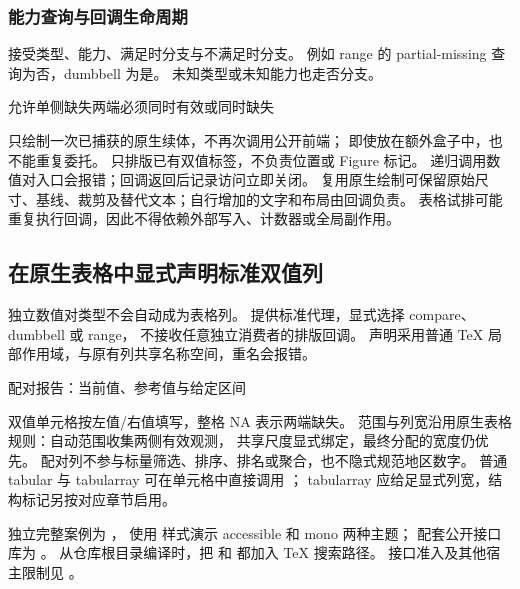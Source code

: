 \subsubsection{能力查询与回调生命周期}
\key{\gradbarsifpairtypecapable} 接受类型、能力、满足时分支与不满足时分支。
例如 range 的 partial-missing 查询为否，dumbbell 为是。
未知类型或未知能力也走否分支。
\begin{codeonly}
  {允许单侧缺失}{两端必须同时有效或同时缺失}
\end{codeonly}
\key{\gradbarspairdefault} 只绘制一次已捕获的原生续体，不再次调用公开前端；
即使放在额外盒子中，也不能重复委托。
\key{\gradbarspairlabel} 只排版已有双值标签，不负责位置或 Figure 标记。
递归调用数值对入口会报错；回调返回后记录访问立即关闭。
复用原生绘制可保留原始尺寸、基线、裁剪及替代文本；自行增加的文字和布局由回调负责。
表格试排可能重复执行回调，因此不得依赖外部写入、计数器或全局副作用。

\subsection{在原生表格中显式声明标准双值列}
\label{sec:pair-columns-cn}
独立数值对类型不会自动成为表格列。
\key{\gradbarsdeclarepaircolumn} 提供标准代理，显式选择 compare、dumbbell 或 range，
不接收任意独立消费者的排版回调。
声明采用普通 TeX 局部作用域，与原有列共享名称空间，重名会报错。
\begin{example}[text and listing,sidebyside=false]{配对报告：当前值、参考值与给定区间}
\begingroup
{}
\begin{center}
\begin{gradtable}[style=paired-report,width=\linewidth,label width=25mm]
\end{gradtable}
\end{center}
\endgroup
\end{example}
双值单元格按左值/右值填写，整格 NA 表示两端缺失。
范围与列宽沿用原生表格规则：自动范围收集两侧有效观测，
共享尺度显式绑定，最终分配的宽度仍优先。
配对列不参与标量筛选、排序、排名或聚合，也不隐式规范地区数字。
普通 tabular 与 tabularray 可在单元格中直接调用 \key{\gradpairgraphic}；
tabularray 应给足显式列宽，结构标记另按对应章节启用。

独立完整案例为 ，
使用  样式演示 accessible 和 mono 两种主题；
配套公开接口库为 。
从仓库根目录编译时，把  和  都加入 TeX 搜索路径。
接口准入及其他宿主限制见 。
